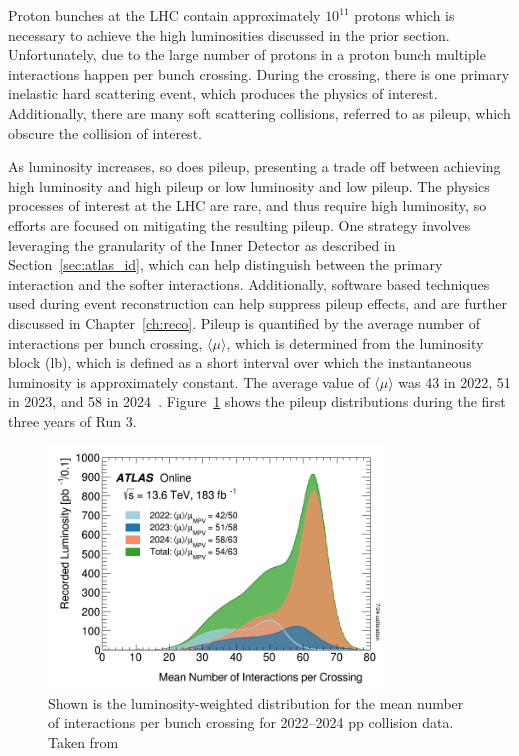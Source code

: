 Proton bunches at the LHC contain approximately $10^{11}$ protons which is necessary to achieve the high luminosities discussed in the prior section. Unfortunately, due to the large number of protons in a proton bunch multiple interactions happen per bunch crossing. During the crossing, there is one primary inelastic hard scattering event, which produces the physics of interest. Additionally, there are many soft scattering collisions, referred to as pileup, which obscure the collision of interest.

As luminosity increases, so does pileup, presenting a trade off between achieving high luminosity and high pileup or low luminosity and low pileup. The physics processes of interest at the LHC are rare, and thus require high luminosity, so efforts are focused on mitigating the resulting pileup. One strategy involves leveraging the granularity of the Inner Detector as described in Section~\ref{sec:atlas_id}, which can help distinguish between the primary interaction and the softer interactions. Additionally, software based techniques used during event reconstruction can help suppress pileup effects, and are further discussed in Chapter~\ref{ch:reco}.
Pileup is quantified by the average number of interactions per bunch crossing, $\langle \mu \rangle$, which is determined from the luminosity block (lb), which is defined as a short interval over which the instantaneous luminosity is approximately constant. The average value of $\langle \mu \rangle$ was 43 in 2022, 51 in 2023, and 58 in 2024~\cite{atlas_pileup_image}. Figure~\ref{fig:atlas_run3_pileup} shows the pileup distributions during the first three years of Run 3.

\begin{figure}
    \centering
    \includegraphics[width=0.8\textwidth]{figures/atlas/atlas_run3_pileup.png}
    \caption{Shown is the luminosity-weighted distribution for the mean number of interactions per bunch crossing for 2022--2024 pp collision data. Taken from~\cite{atlas_pileup_image}}\label{fig:atlas_run3_pileup}
\end{figure}